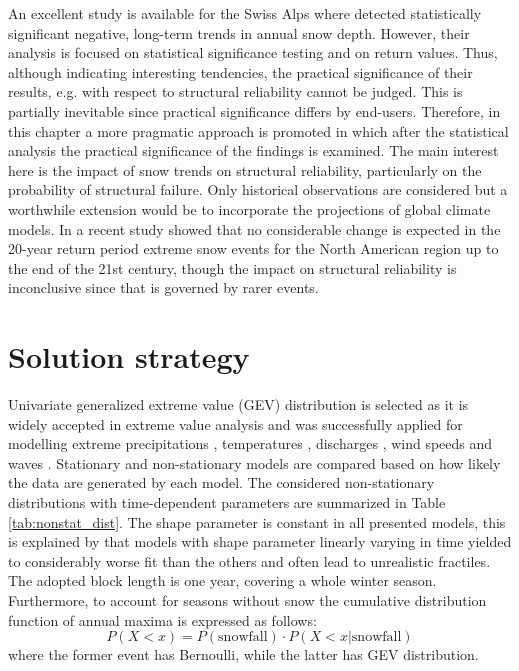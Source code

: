 An excellent study is available for the Swiss Alps where \citet{Marty2012} detected statistically significant negative, long-term trends in annual snow depth. However, their analysis is focused on statistical significance testing and on return values. Thus, although indicating interesting tendencies, the practical significance of their results, e.g. with respect to structural reliability cannot be judged. This is partially inevitable since practical significance differs by end-users. Therefore, in this chapter a more pragmatic approach is promoted in which after the statistical analysis the practical significance of the findings is examined. The main interest here is the impact of snow trends on structural reliability, particularly on the probability of structural failure. Only historical observations are considered but a worthwhile extension would be to incorporate the projections of global climate models. In a recent study \citet{Ogorman2014} showed that no considerable change is expected in the 20-year return period extreme snow events for the North American region up to the end of the 21st century, though the impact on structural reliability is inconclusive since that is governed by rarer events.

\section{Solution strategy}

Univariate generalized extreme value (GEV) distribution is selected as it is widely accepted in extreme value analysis \citep{Klein2009} and was successfully applied for modelling extreme precipitations \citep{Coles2003catastrophes}, temperatures \citep{Guttorp2011}, discharges \citep{Hao2015}, wind speeds \citep{Hundecha2008} and waves \citep{Caires2006}. Stationary and non-stationary models are compared based on how likely the data are generated by each model. The considered non-stationary distributions with time-dependent parameters are summarized in Table \ref{tab:nonstat_dist}. The shape parameter is constant in all presented models, this is explained by that models with shape parameter linearly varying in time yielded to considerably worse fit than the others and often lead to unrealistic fractiles. The adopted block length is one year, covering a whole winter season. Furthermore, to account for seasons without snow the cumulative distribution function of annual maxima is expressed as follows:
\begin{equation}
	P\left( {X < x} \right) = P\left( {{\mathrm{snowfall}}} \right) \cdot P\left( {X < x|{\mathrm{snowfall}}} \right)
\end{equation}
where the former event has Bernoulli, while the latter has GEV distribution.

